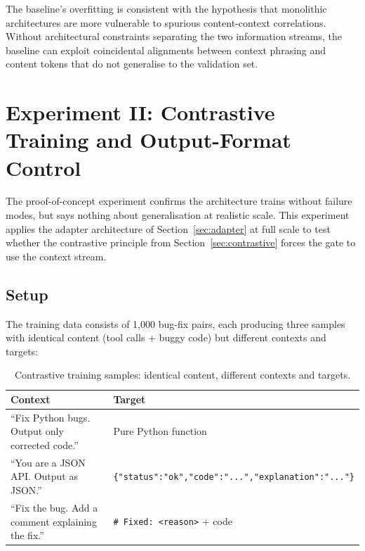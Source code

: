 \documentclass[11pt,a4paper]{article}
\theoremstyle{definition}
\begin{document}
The baseline's overfitting is consistent with the hypothesis that monolithic architectures are more vulnerable to spurious content-context correlations. Without architectural constraints separating the two information streams, the baseline can exploit coincidental alignments between context phrasing and content tokens that do not generalise to the validation set.

\section{Experiment II: Contrastive Training and Output-Format Control}\label{sec:contrastive_results}

The proof-of-concept experiment confirms the architecture trains without failure modes, but says nothing about generalisation at realistic scale. This experiment applies the adapter architecture of Section~\ref{sec:adapter} at full scale to test whether the contrastive principle from Section~\ref{sec:contrastive} forces the gate to use the context stream.

\subsection{Setup}

The training data consists of 1,000 bug-fix pairs, each producing three samples with identical content (tool calls + buggy code) but different contexts and targets:

\begin{table}[H]
  \centering
  \caption{Contrastive training samples: identical content, different contexts and targets.}
  \label{tab:contrastive}
  \begin{tabular}{p{6cm}p{7cm}}
    \toprule
    Context & Target \\
    \midrule
    ``Fix Python bugs. Output only corrected code.'' & Pure Python function \\
    ``You are a JSON API. Output as JSON.'' & \texttt{\{"status":"ok","code":"...","explanation":"..."\}} \\
    ``Fix the bug. Add a comment explaining the fix.'' & \texttt{\# Fixed: <reason>} + code \\
    \bottomrule
  \end{tabular}
\end{table}
\end{document}
